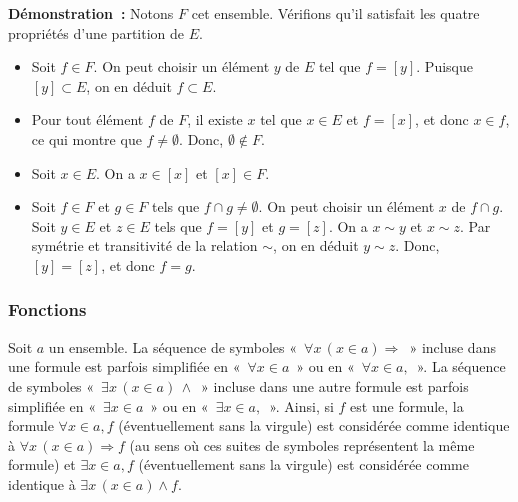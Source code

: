 \noindent \textbf{Démonstration :} 
Notons $F$ cet ensemble. 
Vérifions qu'il satisfait les quatre propriétés d'une partition de $E$.
\begin{itemize}
    \item Soit $f \in F$. On peut choisir un élément $y$ de $E$ tel que $f = [y]$. Puisque $[y] \subset E$, on en déduit $f \subset E$.
    \item Pour tout élément $f$ de $F$, il existe $x$ tel que $x \in E$ et $f = [x]$, et donc $x \in f$, ce qui montre que $f \neq \emptyset$. 
        Donc, $\emptyset \notin F$. 
    \item Soit $x \in E$. On a $x \in [x]$ et $[x] \in F$. 
    \item Soit $f \in F$ et $g \in F$ tels que $f \cap g \neq \emptyset$. 
        On peut choisir un élément $x$ de $f \cap g$. 
        Soit $y \in E$ et $z \in E$ tels que $f = [y]$ et $g = [z]$. 
        On a $x \sim y$ et $x \sim z$. 
        Par symétrie et transitivité de la relation $\sim$, on en déduit $y \sim z$. 
        Donc, $[y] = [z]$, et donc $f = g$.
\end{itemize}

\done

\subsubsection{Fonctions}
\label{sub:fonctions}

Soit $a$ un ensemble. 
La séquence de symboles « $\forall x \, (x \in a) \Rightarrow$ » incluse dans une formule est parfois simplifiée en « $\forall x \in a$ » ou en « $\forall x \in a,$ ».
La séquence de symboles « $\exists x \, (x \in a) \, \wedge$ » incluse dans une autre formule est parfois simplifiée en « $\exists x \in a$ » ou en « $\exists x \in a,$ ». 
Ainsi, si $f$ est une formule, la formule $\forall x \in a, f$ (éventuellement sans la virgule) est considérée comme identique à $\forall x \, (x \in a) \Rightarrow f$ (au sens où ces suites de symboles représentent la même formule) et $\exists x \in a, f$ (éventuellement sans la virgule) est considérée comme identique à $\exists x \, (x \in a) \wedge f$.

\medskip

